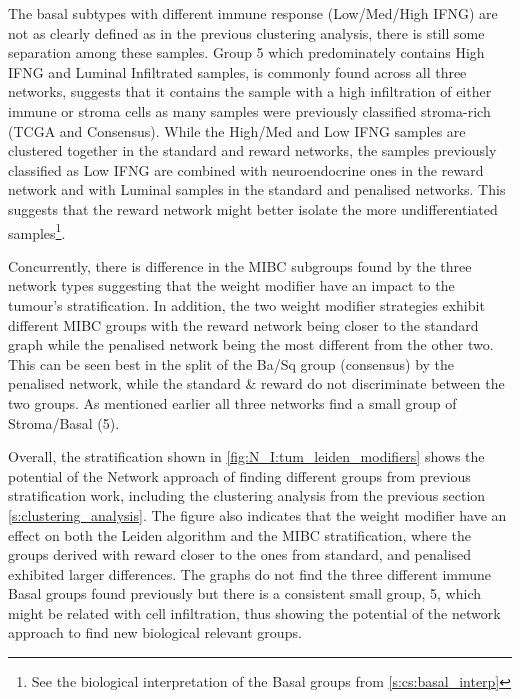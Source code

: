 The basal subtypes with different immune response (Low/Med/High IFNG) are not as clearly defined as in the previous clustering analysis, there is still some separation among these samples. Group 5 which predominately contains High IFNG and Luminal Infiltrated samples, is commonly found across all three networks, suggests that it contains the sample with a high infiltration of either immune or stroma cells as many samples were previously classified stroma-rich (TCGA and Consensus). While the High/Med and Low IFNG samples are clustered together in the standard and reward networks, the samples previously classified as Low IFNG are combined with neuroendocrine ones in the reward network and with Luminal samples in the standard and penalised networks. This suggests that the reward network might better isolate the more undifferentiated samples\footnote{See the biological interpretation of the Basal groups from \cref{s:cs:basal_interp}}.

Concurrently, there is difference in the MIBC subgroups found by the three network types suggesting that the weight modifier have an impact to the tumour's stratification. In addition, the two weight modifier strategies exhibit different MIBC groups with the reward network being closer to the standard graph while the penalised network being the most different from the other two. This can be seen best in the split of the Ba/Sq group (consensus) by the penalised network, while the standard \& reward do not discriminate between the two groups. As mentioned earlier all three networks find a small group of Stroma/Basal (5).

Overall, the stratification shown in \cref{fig:N_I:tum_leiden_modifiers} shows the potential of the Network approach of finding different groups from previous stratification work, including the clustering analysis from the previous section \cref{s:clustering_analysis}. The figure also indicates that the weight modifier have an effect on both the Leiden algorithm and the MIBC stratification, where the groups derived with reward closer to the ones from standard, and penalised exhibited larger differences. The graphs do not find the three different immune Basal groups found previously but there is a consistent small group, 5, which might be related with cell infiltration, thus showing the potential of the network approach to find new biological relevant groups.




